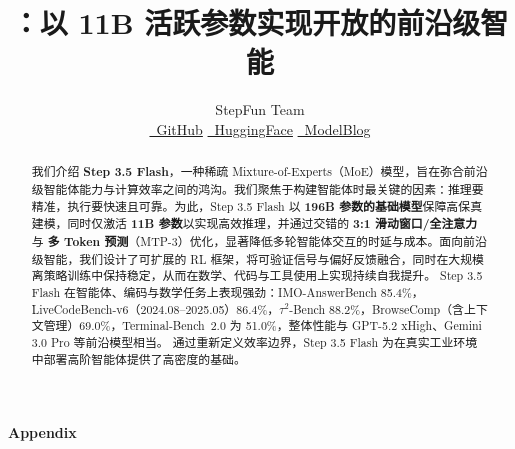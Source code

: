 \documentclass[11pt, a4paper, logo, copyright, nonumbering]{step3p5_turbo_2026}
\title{\centering \ourmodel：以 11B 活跃参数实现开放的前沿级智能}
\author[*]{
\large StepFun Team\\
\normalsize
\href{https://github.com/stepfun-ai/Step-3.5-Flash}{\GHicon\ GitHub}\quad
\href{https://huggingface.co/stepfun-ai/Step-3.5-Flash}{\HFicon\ HuggingFace}\quad
\href{https://static.stepfun.com/blog/step-3.5-flash/}{\STicon\ ModelBlog}
\vspace{-1cm}
}
\newcommand{\ourmodel}{Step 3.5 Flash\xspace}
\begin{document}
\begin{abstract}
我们介绍 \textbf{\ourmodel}，一种稀疏 Mixture-of-Experts（MoE）模型，旨在弥合前沿级智能体能力与计算效率之间的鸿沟。我们聚焦于构建智能体时最关键的因素：推理要精准，执行要快速且可靠。为此，\ourmodel 以 \textbf{196B 参数的基础模型}保障高保真建模，同时仅激活 \textbf{11B 参数}以实现高效推理，并通过交错的 \textbf{3:1 滑动窗口/全注意力} 与 \textbf{多 Token 预测}（MTP-3）优化，显著降低多轮智能体交互的时延与成本。面向前沿级智能，我们设计了可扩展的 RL 框架，将可验证信号与偏好反馈融合，同时在大规模离策略训练中保持稳定，从而在数学、代码与工具使用上实现持续自我提升。
\ourmodel 在智能体、编码与数学任务上表现强劲：IMO-AnswerBench 85.4\%，LiveCodeBench-v6（2024.08–2025.05）86.4\%，$\tau^2$-Bench 88.2\%，BrowseComp（含上下文管理）69.0\%，Terminal-Bench~2.0 为 51.0\%，整体性能与 GPT-5.2 xHigh、Gemini 3.0 Pro 等前沿模型相当。
通过重新定义效率边界，\ourmodel 为在真实工业环境中部署高阶智能体提供了高密度的基础。
\end{abstract}

\maketitle


\begingroup
\setlength{\parskip}{7.5pt}
\selectfont
\tableofcontents
\endgroup











\newpage
{\Large\textbf{Appendix}}
\appendix



{
\linespread{0.75}\selectfont

}
\end{document}
